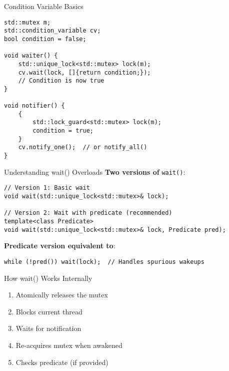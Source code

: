 \begin{frame}[fragile]{Condition Variable Basics}
	\begin{verbatim}
std::mutex m;
std::condition_variable cv;
bool condition = false;

void waiter() {
    std::unique_lock<std::mutex> lock(m);
    cv.wait(lock, []{return condition;});
    // Condition is now true
}

void notifier() {
    {
        std::lock_guard<std::mutex> lock(m);
        condition = true;
    }
    cv.notify_one();  // or notify_all()
}
	\end{verbatim}
\end{frame}

\begin{frame}[fragile]{Understanding wait() Overloads}
	\textbf{Two versions of} \texttt{wait()}:

	\begin{verbatim}
// Version 1: Basic wait
void wait(std::unique_lock<std::mutex>& lock);

// Version 2: Wait with predicate (recommended)
template<class Predicate>
void wait(std::unique_lock<std::mutex>& lock, Predicate pred);
	\end{verbatim}

	\textbf{Predicate version equivalent to}:
	\begin{verbatim}
while (!pred()) wait(lock);  // Handles spurious wakeups
	\end{verbatim}
\end{frame}


\begin{frame}[fragile]{How wait() Works Internally}
	\begin{enumerate}
		\item Atomically releases the mutex
		\item Blocks current thread
		\item Waits for notification
		\item Re-acquires mutex when awakened
		\item Checks predicate (if provided)
	\end{enumerate}
\end{frame}

